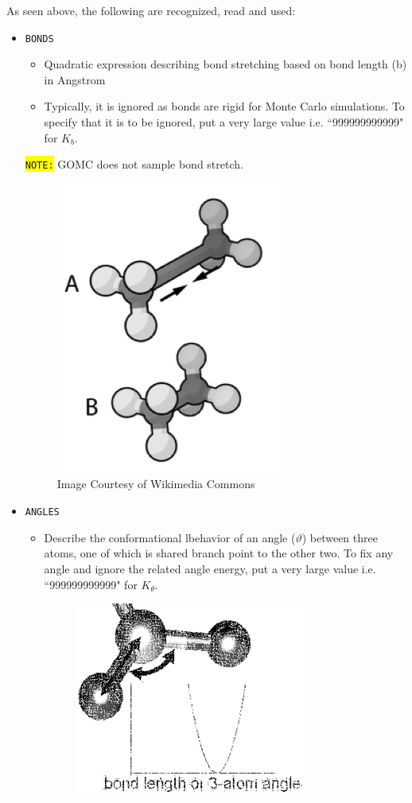 As seen above, the following are recognized, read and used:
\begin{itemize}
\item \texttt{BONDS}
\begin{itemize}
\item Quadratic expression describing bond stretching based on bond length (b) in Angstrom
\item Typically, it is ignored as bonds are rigid for Monte Carlo simulations. To specify that it is to be ignored, put a very large value i.e. ``999999999999" for $K_b$.
\end{itemize}
\colorbox{yellow}{\texttt{NOTE:}} GOMC does not sample bond stretch.
\begin{figure}[H]
\centering
\includegraphics[scale=1.0]{images/bonds}
\caption{Image Courtesy of Wikimedia Commons}
\end{figure}
\item \texttt{ANGLES}
\begin{itemize}
\item Describe the conformational lbehavior of an angle ($\vartheta$) between three atoms, one of which is shared branch point to the other two. To fix any angle and ignore the related angle energy, put a very large value i.e. ``999999999999" for $K_{\theta}$.
\begin{figure}[H]
\centering
\includegraphics[scale=1.0]{images/angle}

\end{figure}
\end{itemize}
\end{itemize}
